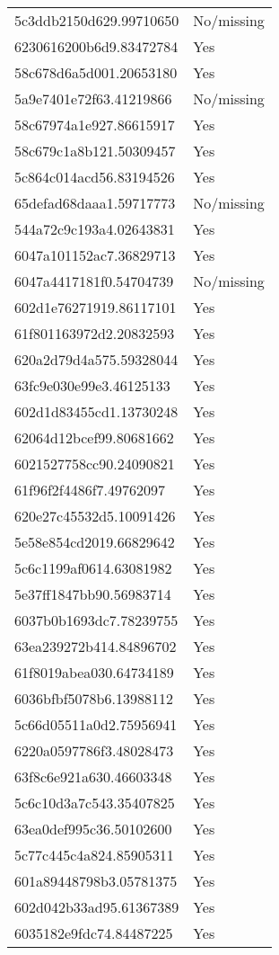 \begin{tabular}{ll}
5c3ddb2150d629.99710650 & No/missing \\
6230616200b6d9.83472784 & Yes \\
58c678d6a5d001.20653180 & Yes \\
5a9e7401e72f63.41219866 & No/missing \\
58c67974a1e927.86615917 & Yes \\
58c679c1a8b121.50309457 & Yes \\
5c864c014acd56.83194526 & Yes \\
65defad68daaa1.59717773 & No/missing \\
544a72c9c193a4.02643831 & Yes \\
6047a101152ac7.36829713 & Yes \\
6047a4417181f0.54704739 & No/missing \\
602d1e76271919.86117101 & Yes \\
61f801163972d2.20832593 & Yes \\
620a2d79d4a575.59328044 & Yes \\
63fc9e030e99e3.46125133 & Yes \\
602d1d83455cd1.13730248 & Yes \\
62064d12bcef99.80681662 & Yes \\
6021527758cc90.24090821 & Yes \\
61f96f2f4486f7.49762097 & Yes \\
620e27c45532d5.10091426 & Yes \\
5e58e854cd2019.66829642 & Yes \\
5c6c1199af0614.63081982 & Yes \\
5e37ff1847bb90.56983714 & Yes \\
6037b0b1693dc7.78239755 & Yes \\
63ea239272b414.84896702 & Yes \\
61f8019abea030.64734189 & Yes \\
6036bfbf5078b6.13988112 & Yes \\
5c66d05511a0d2.75956941 & Yes \\
6220a0597786f3.48028473 & Yes \\
63f8c6e921a630.46603348 & Yes \\
5c6c10d3a7c543.35407825 & Yes \\
63ea0def995c36.50102600 & Yes \\
5c77c445c4a824.85905311 & Yes \\
601a89448798b3.05781375 & Yes \\
602d042b33ad95.61367389 & Yes \\
6035182e9fdc74.84487225 & Yes \\

\end{tabular}
